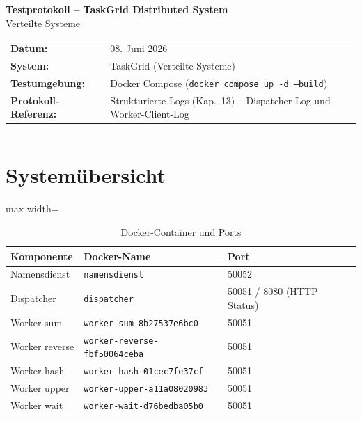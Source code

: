 \documentclass[a4paper,12pt]{article}
\begin{document}
\begin{center}
    {\Large \textbf{Testprotokoll -- TaskGrid Distributed System}}\\[0.5em]
    {\large Verteilte Systeme}\\[1em]
    \begin{tabular}{ll}
        \textbf{Datum:}               & 08. Juni 2026 \\
        \textbf{System:}              & TaskGrid (Verteilte Systeme) \\
        \textbf{Testumgebung:}        & Docker Compose (\texttt{docker compose up -d --build}) \\
        \textbf{Protokoll-Referenz:}  & Strukturierte Logs (Kap.~13) -- Dispatcher-Log und Worker-Client-Log \\
    \end{tabular}
\end{center}

\vspace{1em}
\hrule
\vspace{1.5em}

\section*{Systemübersicht}

\begin{table}[H]
    \centering
    \begin{adjustbox}{max width=\textwidth}
    \begin{tabular}{lll}
        \toprule
        \textbf{Komponente} & \textbf{Docker-Name} & \textbf{Port} \\
        \midrule
        Namensdienst   & \texttt{namensdienst}                    & 50052 \\
        Dispatcher     & \texttt{dispatcher}                      & 50051 / 8080 (HTTP Status) \\
        Worker sum     & \texttt{worker-sum-8b27537e6bc0}         & 50051 \\
        Worker reverse & \texttt{worker-reverse-fbf50064ceba}     & 50051 \\
        Worker hash    & \texttt{worker-hash-01cec7fe37cf}        & 50051 \\
        Worker upper   & \texttt{worker-upper-a11a08020983}       & 50051 \\
        Worker wait    & \texttt{worker-wait-d76bedba05b0}        & 50051 \\
        \bottomrule
    \end{tabular}
    \end{adjustbox}
    \caption{Docker-Container und Ports}
\end{table}
\end{document}
